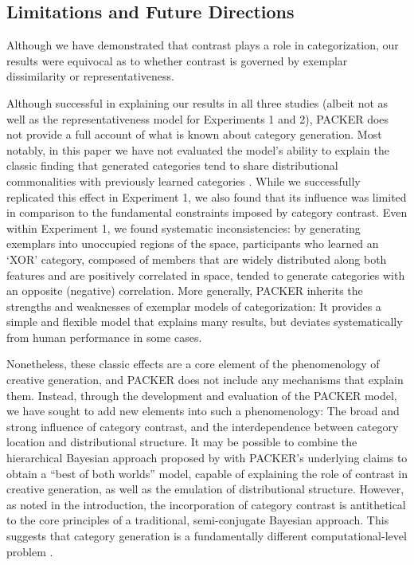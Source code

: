 \documentclass[12pt]{article}
\begin{document}
\begin{flushleft}
{\subsection{Limitations and Future Directions} Although we have demonstrated
that contrast plays a role in categorization, our results were equivocal as to
whether contrast is governed by exemplar dissimilarity or representativeness.

Although successful in explaining our results in all three studies (albeit not
as well as the representativeness model for Experiments 1 and 2), PACKER does
not provide a full account of what is known about category generation. Most
notably, in this paper we have not evaluated the model's ability to explain the
classic finding that generated categories tend to share distributional
commonalities with previously learned categories
\citep[see][]{jern2013probabilistic,ward1994structured}. While we successfully
replicated this effect in Experiment 1, we also found that its influence was
limited in comparison to the fundamental constraints imposed by category
contrast. Even within Experiment 1, we found systematic inconsistencies: by
generating exemplars into unoccupied regions of the space, participants who
learned an `XOR' category, composed of members that are widely distributed along
both features and are positively correlated in space, tended to generate
categories with an opposite (negative) correlation. More generally, PACKER
inherits the strengths and weaknesses of exemplar models of categorization: It
provides a simple and flexible model that explains many results, but deviates
systematically from human performance in some cases.

Nonetheless, these classic effects are a core element of the phenomenology of
creative generation, and PACKER does not include any mechanisms that explain
them. Instead, through the development and evaluation of the PACKER model, we
have sought to add new elements into such a phenomenology: The broad and strong
influence of category contrast, and the interdependence between category
location and distributional structure. It may be possible to combine the
hierarchical Bayesian approach proposed by \cite{jern2013probabilistic} with
PACKER's underlying claims to obtain a ``best of both worlds'' model, capable of
explaining the role of contrast in creative generation, as well as the emulation
of distributional structure. However, as noted in the introduction, the
incorporation of category contrast is antithetical to the core principles of a
traditional, semi-conjugate Bayesian approach. This suggests that category
generation is a fundamentally different computational-level problem
\citep[different from those posed by][]{jern2013probabilistic,kemp2014taxonomy}.

}
\end{flushleft}
\end{document}
